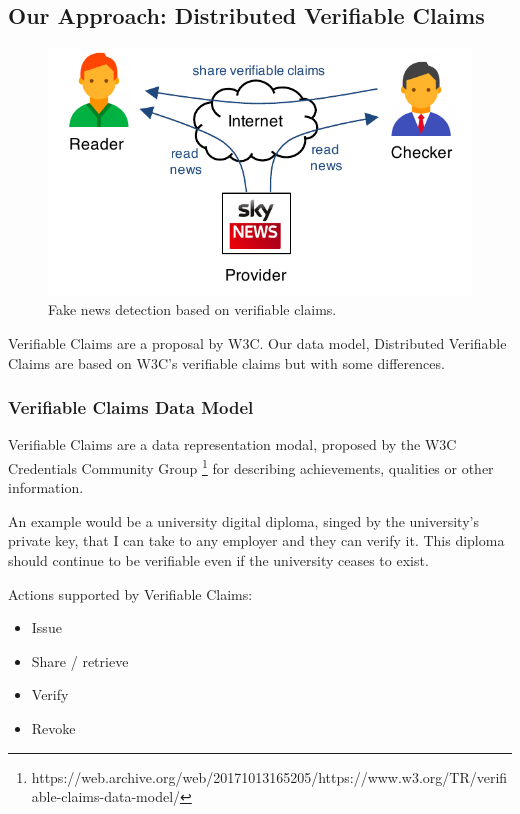 \documentclass[letterpaper,twocolumn,10pt]{article}
\begin{document}

\subsection{Our Approach: Distributed Verifiable Claims}


\begin{figure}[t]
  \centering
  \includegraphics[width=0.9\columnwidth]{figures/model.pdf}
  \vspace{-10pt}
  \caption{Fake news detection based on verifiable claims.}
  \label{fig:model}
\end{figure}

Verifiable Claims are a proposal by W3C. Our data model, Distributed Verifiable Claims are based on W3C's verifiable claims but with some differences.

\subsubsection{Verifiable Claims Data Model}
Verifiable Claims are a data representation modal, proposed by the W3C Credentials Community Group \footnote{https://web.archive.org/web/20171013165205/https://www.w3.org/TR/verifiable-claims-data-model/} for describing achievements, qualities or other information.

An example would be a university digital diploma, singed by the university’s private key, that I can take to any employer and they can verify it. This diploma should continue to be verifiable even if the university ceases to exist.

Actions supported by Verifiable Claims:
\begin{itemize}
    \item Issue
    \item Share / retrieve
    \item Verify
    \item Revoke
\end{itemize}
\end{document}
